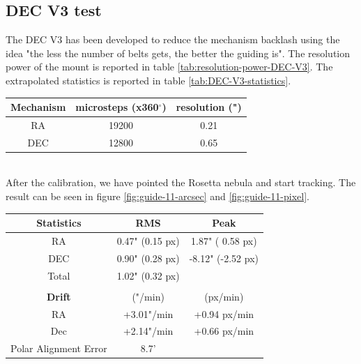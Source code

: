 \documentclass{article}
\begin{document}
\begin{multicols}{2}
        \subsection{DEC V3 test}
        The DEC V3 has been developed to reduce the mechanism backlash using the idea "the less the number of belts gets, the better the guiding is".
        The resolution power of the mount is reported in table \ref{tab:resolution-power-DEC-V3}.
        The extrapolated statistics is reported in table \ref{tab:DEC-V3-statistics}.
        \\
        \begin{minipage}
            {.5\textwidth}
            \begin{tabular}{ccc}
                Mechanism & microsteps (x360$^{\circ}$) & resolution (") \\
                \hline
                RA  & 19200 & 0.21\\ 
                DEC & 12800 & 0.65
            \end{tabular}
            \label{tab:resolution-power-DEC-V3}
        \end{minipage}
        \\
        After the calibration, we have pointed the Rosetta nebula and start tracking.
        The result can be seen in figure \ref{fig:guide-11-arcsec} and \ref{fig:guide-11-pixel}.
        \\
        \begin{minipage}{.4\textwidth}
            \centering
            \begin{tabular}{ccc}
                \textbf{Statistics}&RMS&Peak\\
                \hline
                RA& 0.47" (0.15 px)& 1.87" ( 0.58 px)\\
                DEC& 0.90" (0.28 px)&-8.12" (-2.52 px)\\
                Total& 1.02" (0.32 px)&\\
                \\
                \textbf{Drift}& ("/min) & (px/min)\\
                \hline
                RA& +3.01"/min& +0.94 px/min\\
                Dec& +2.14"/min& +0.66 px/min\\
                Polar Alignment Error& 8.7'&\\
                \hline
            \end{tabular}
            \label{tab:DEC-V3-statistics}
        \end{minipage}



\end{multicols}
\end{document}

